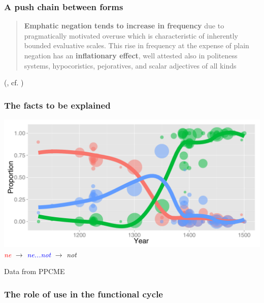 \documentclass[compress]{beamer}
\begin{document}
\begin{frame}
\frametitle{A push chain between forms}
      \begin{block}{}
      \begin{quote}
		\textbf{Emphatic negation tends to increase in frequency} due to pragmatically motivated overuse which is characteristic of inherently bounded evaluative scales. This rise in frequency at the expense of plain negation has an \textbf{inflationary effect}, well attested also in politeness systems, hypocoristics, pejoratives, and scalar adjectives of all kinds
	\end{quote}
	\end{block}
 \vfill\hfill (\cite{kiparsky-condoravdi:2006}, cf. \cite{dahl:2001})
\end{frame}



\begin{frame}
\frametitle{The facts to be explained}
	\begin{center}
		\includegraphics[width=.75\textwidth]{neg-docs-lines.pdf}\\
		\emph{\textcolor{red}{ne}} $\rightarrow$ \emph{\textcolor{blue}{ne...not}} $\rightarrow$ \emph{\textcolor{mygreen}{not}}
	\end{center}
	\vfill \hfill Data from PPCME \citep{ppcme2} 
\end{frame}


\begin{frame}
\frametitle{The role of use in the functional cycle}
  \begin{center}
  \end{center}
\end{frame}
\end{document}
